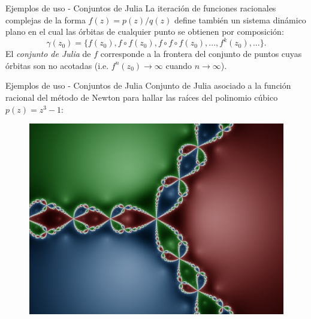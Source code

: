 \documentclass{beamer}
\begin{document}
\begin{frame}{Ejemplos de uso - Conjuntos de Julia}
La iteración de funciones racionales complejas de la forma $f(z) = p(z) / q(z)$ define también un sistema dinámico plano en el cual las órbitas de cualquier punto se obtienen por composición:
$$ \gamma(z_0) = \{f(z_0), f\circ f(z_0), f \circ f \circ f(z_0), ..., f^k(z_0), ...\}. $$
El \emph{conjunto de Julia} de $f$ corresponde a la frontera del conjunto de puntos cuyas órbitas son no acotadas (i.e. $f^n(z_0) \to \infty$ cuando $n \to \infty$).
\end{frame}

\begin{frame}{Ejemplos de uso - Conjuntos de Julia}
Conjunto de Julia asociado a la función racional del método de Newton para hallar las raíces del polinomio cúbico $p(z) = z^3 - 1$:
\begin{figure}[!ht] \centering
 \includegraphics[scale=0.1]{figures/juliaset-newton.png}
\end{figure}
\end{frame}
\end{document}
